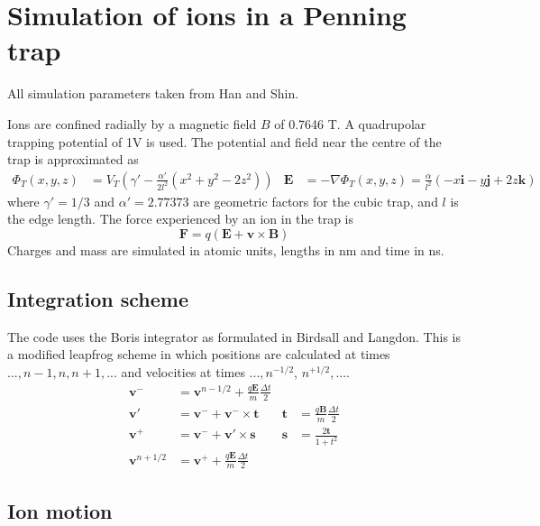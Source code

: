 \documentclass[10pt,conference,onecolumn]{IEEEtran}
\begin{document}
\section{Simulation of ions in a Penning trap}

All simulation parameters taken from Han and Shin\cite{Han1997}.

Ions are confined radially by a magnetic field $B$ of 0.7646 T.
A quadrupolar trapping potential of 1V is used.
The potential and field near the centre of the trap is approximated as 
\begin{align}
\Phi_T(x,y,z) &= V_T (\gamma' - \frac{\alpha'}{2l^2}(x^2 + y^2 - 2z^2)) &
\mathbf{E} &= - \nabla \Phi_T(x,y,z) = \frac{\alpha}{l^2}(-x\mathbf{i} -y\mathbf{j} +2z\mathbf{k})
\end{align}
where $\gamma' = 1/3$ and $\alpha' = 2.77373$ are geometric factors for the cubic trap, and $l$ is the edge length\cite{Guan1995}.
The force experienced by an ion in the trap is
\begin{equation}
\mathbf{F} = q(\mathbf{E} + \mathbf{v} \times \mathbf{B})
\end{equation}
Charges and mass are simulated in atomic units, lengths in nm and time in ns.



\subsection{Integration scheme}
The code uses the Boris integrator\cite{Boris1970} as formulated in Birdsall and Langdon\cite{Birdsall1985}.
This is a modified leapfrog scheme in which positions are calculated at times $..., n-1, n, n+1, ...$ and velocities at times $..., n^{-1/2}$, $n^{+1/2}, ...$.
\begin{align}
\mathbf{v}^- &= \mathbf{v}^{n-1/2} + \frac{q \mathbf{E}}{m} \frac{\Delta t}{2} \\
\mathbf{v}'  &= \mathbf{v}^- + \mathbf{v}^- \times \mathbf{t} & \mathbf{t}   &= \frac{q\mathbf{B}}{m} \frac{\Delta t}{2} \\
\mathbf{v}^+ &= \mathbf{v}^- + \mathbf{v}' \times \mathbf{s} & \mathbf{s}   &= \frac{2\mathbf{t}}{1 + t^2} \\
\mathbf{v}^{n+1/2} &= \mathbf{v}^+ + \frac{q \mathbf{E}}{m} \frac{\Delta t}{2}
\end{align}


\subsection{Ion motion}
\end{document}
